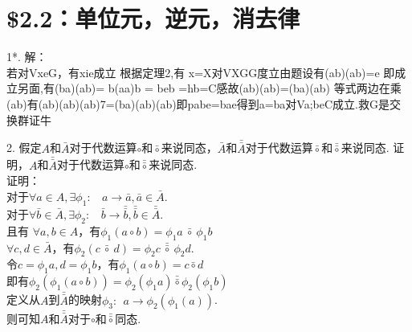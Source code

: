 \documentclass{ctexart}
\begin{document}
\section*{\$2.2：单位元，逆元，消去律}
1*. 
解：\\ 
若对VxeG，有xie成立
根据定理2,有 x=X对VXGG度立由题设有(ab)(ab)=e 即成立另面,有(ba)(ab)= b(aa)b = beb =hb=C感故(ab)(ab)=(ba)(ab)
等式两边在乘(ab)有(ab)(ab)(ab)7=(ba)(ab)(ab)即pabe=bae得到a=ba对Va;beC成立.救G是交换群证牛

2. 假定$A$和$\bar{A}$对于代数运算$\circ$和$\bar{\circ}$来说同态，$\bar{A}$和$\bar{\bar{A}}$对于代数运算$\bar{\circ}$和$\bar{\bar{\circ}}$来说同态. 证明，$A$和$\bar{\bar{A}}$对于代数运算$\circ$和$\bar{\bar{\circ}}$来说同态. \\
证明：\\
对于$\forall a \in A, \exists \phi_1: \ \ \ \ a \rightarrow \bar{a}, \bar{a} \in \bar{A}.$ \\
对于$\forall \bar{b} \in \bar{A}, \exists \phi_2: \ \ \ \ \bar{b} \rightarrow \bar{\bar{b}}, \bar{\bar{b}} \in \bar{\bar{A}}.$ \\
且有 $\forall a,b \in A$，有$\phi_1(a \circ b) = \phi_1 a \ \bar{\circ} \  \phi_1 b$\\
 $\forall c,d \in \bar{A}$，有$\phi_2(c \ \bar{\circ} \ d) = \phi_2 c \  \bar{\bar{\circ}} \ \phi_2 d$. \\
令$c = \phi_1 a , d = \phi_1 b$，有$\phi_1 (a \circ b) = c \bar{\circ} d$ \\
即有$\phi_2(\phi_1(a \circ b)) = \phi_2 (\phi_1 a) \bar{\bar{\circ}} \phi_2(\phi_1 b)$ \\
定义从$A$到$\bar{\bar{A}}$的映射$\phi_3: \ \ a \rightarrow \phi_2(\phi_1(a))$. \\
则可知$A$和$\bar{\bar{A}}$对于$\circ$和$\bar{\bar{\circ}}$同态.
\end{document}
